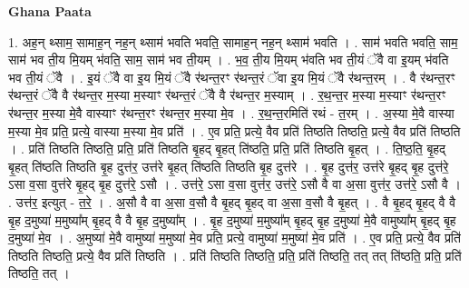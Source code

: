 \documentclass[17pt]{extarticle}
\begin{document}
\textbf{Ghana Paata } \newline

1. अह॒न् थ्साम॒ सामाह॒न् नह॒न् थ्साम॑ भवति भवति॒ सामाह॒न् नह॒न् थ्साम॑ भवति । . साम॑ भवति भवति॒ साम॒ साम॑ भव ती॒य मि॒यम् भ॑वति॒ साम॒ साम॑ भव ती॒यम् । . भ॒व॒ ती॒य मि॒यम् भ॑वति भव ती॒यं ॅवै वा इ॒यम् भ॑वति भव ती॒यं ॅवै । . इ॒यं ॅवै वा इ॒य मि॒यं ॅवै र॑थन्त॒रꣳ र॑थन्त॒रं ॅवा इ॒य मि॒यं ॅवै र॑थन्त॒रम् । . वै र॑थन्त॒रꣳ र॑थन्त॒रं ॅवै वै र॑थन्त॒र म॒स्या म॒स्याꣳ र॑थन्त॒रं ॅवै वै र॑थन्त॒र म॒स्याम् । . र॒थ॒न्त॒र म॒स्या म॒स्याꣳ र॑थन्त॒रꣳ र॑थन्त॒र म॒स्या मे॒वै वास्याꣳ र॑थन्त॒रꣳ र॑थन्त॒र म॒स्या मे॒व । . र॒थ॒न्त॒रमिति॑ रथं - त॒रम् । . अ॒स्या मे॒वै वास्या म॒स्या मे॒व प्रति॒ प्रत्ये॒ वास्या म॒स्या मे॒व प्रति॑ । . ए॒व प्रति॒ प्रत्ये॒ वैव प्रति॑ तिष्ठति तिष्ठति॒ प्रत्ये॒ वैव प्रति॑ तिष्ठति । . प्रति॑ तिष्ठति तिष्ठति॒ प्रति॒ प्रति॑ तिष्ठति बृ॒हद् बृ॒हत् ति॑ष्ठति॒ प्रति॒ प्रति॑ तिष्ठति बृ॒हत् । . ति॒ष्ठ॒ति॒ बृ॒हद् बृ॒हत् ति॑ष्ठति तिष्ठति बृ॒ह दुत्त॑र॒ उत्त॑रे बृ॒हत् ति॑ष्ठति तिष्ठति बृ॒ह दुत्त॑रे । . बृ॒ह दुत्त॑र॒ उत्त॑रे बृ॒हद् बृ॒ह दुत्त॑रे॒ ऽसा व॒सा वुत्त॑रे बृ॒हद् बृ॒ह दुत्त॑रे॒ ऽसौ । . उत्त॑रे॒ ऽसा व॒सा वुत्त॑र॒ उत्त॑रे॒ ऽसौ वै वा अ॒सा वुत्त॑र॒ उत्त॑रे॒ ऽसौ वै । . उत्त॑र॒ इत्युत् - त॒रे॒ । . अ॒सौ वै वा अ॒सा व॒सौ वै बृ॒हद् बृ॒हद् वा अ॒सा व॒सौ वै बृ॒हत् । . वै बृ॒हद् बृ॒हद् वै वै बृ॒ह द॒मुष्या॑ म॒मुष्या᳚म् बृ॒हद् वै वै बृ॒ह द॒मुष्या᳚म् । . बृ॒ह द॒मुष्या॑ म॒मुष्या᳚म् बृ॒हद् बृ॒ह द॒मुष्या॑ मे॒वै वामुष्या᳚म् बृ॒हद् बृ॒ह द॒मुष्या॑ मे॒व । . अ॒मुष्या॑ मे॒वै वामुष्या॑ म॒मुष्या॑ मे॒व प्रति॒ प्रत्ये॒ वामुष्या॑ म॒मुष्या॑ मे॒व प्रति॑ । . ए॒व प्रति॒ प्रत्ये॒ वैव प्रति॑ तिष्ठति तिष्ठति॒ प्रत्ये॒ वैव प्रति॑ तिष्ठति । . प्रति॑ तिष्ठति तिष्ठति॒ प्रति॒ प्रति॑ तिष्ठति॒ तत् तत् ति॑ष्ठति॒ प्रति॒ प्रति॑ तिष्ठति॒ तत् । \newline
\end{document}
